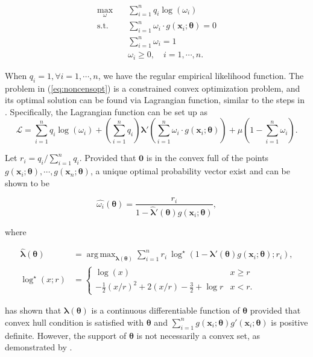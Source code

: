 \documentclass[article]{jss}
\newcommand{\xx}{\bm x}
\newcommand{\tth}{\bm \theta}
\newcommand{\lla}{\bm \lambda}
\newcommand{\w}{\omega}
\renewcommand{\L}{\mathcal{L}}
\newcommand{\str}[1]{{#1}^{\star}}
\DeclareMathOperator*{\argmax}{arg\,max}
\renewcommand{\|}{\,|\,}
\begin{document}
\begin{equation} \label{eq:noncensopt}
\begin{split}
  \max_{\w}\quad & \sum_{i=1}^n q_i \log(\w_i) \\
  \text{s.t.}\quad & \sum_{i=1}^n \w_i\cdot g(\xx_i;\tth) = 0 \\
  & \sum_{i=1}^n \w_i = 1 \\
  & \w_i \geq 0, \quad i=1,\cdots,n.
\end{split}
\end{equation}

When \(q_i = 1, \forall i=1,\cdots,n\), we have the regular empirical likelihood function. The problem in (\ref{eq:noncensopt}) is a constrained convex optimization problem, and its optimal solution can be found via Lagrangian function, similar to the steps in \citet{owen1990}. Specifically, the Lagrangian function can be set up as
\begin{equation} \label{eq:lagrange}
  \L = \sum_{i=1}^n q_i\log(\w_i) + (\sum_{i=1}^n q_i)\lla'(\sum_{i=1}^n \w_i \cdot g(\xx_i;\tth)) + \mu(1-\sum_{i=1}^n \w_i).
\end{equation}

Let \(r_i = q_i/\sum_{i=1}^n q_i\). Provided that \(\bm 0\) is in the convex full of the points \(g(\xx_i;\tth),\cdots,g(\xx_n;\tth)\), a unique optimal probability vector exist and can be shown to be

\begin{equation}\label{eq:omegahat}
  \hat{\w_i}(\tth) = \frac{r_i}{1 - \hat{\lla}'(\tth) g(\xx_i;\tth)},
\end{equation}

where

\begin{equation}
\begin{aligned}
\hat{\lla}(\tth) &= \argmax_{\lla(\tth)} \sum_{i=1}^n r_i\ \str\log\left(1 - \lla'(\tth) g(\xx_i;\tth); r_i\right), \\
\str\log(x; r) &= 
\begin{cases} 
\log(x) & x \ge r \\
- \frac{1}{2} (x/r)^2 + 2 (x/r) - \frac{3}{2} + \log r & x < r.
\end{cases}
\end{aligned}
\label{eq:optim}
\end{equation}

\citet{qin-lawless1994} has shown that \(\lla(\tth)\) is a continuous differentiable function of \(\tth\) provided that convex hull condition is satisfied with \(\tth\) and \(\sum_{i=1}^n g(\xx_i;\tth)g'(\xx_i;\tth)\) is positive definite. However, the support of \(\tth\) is not necessarily a convex set, as demonstrated by \citet{chaudhuri-et-al2017}.
\end{document}
